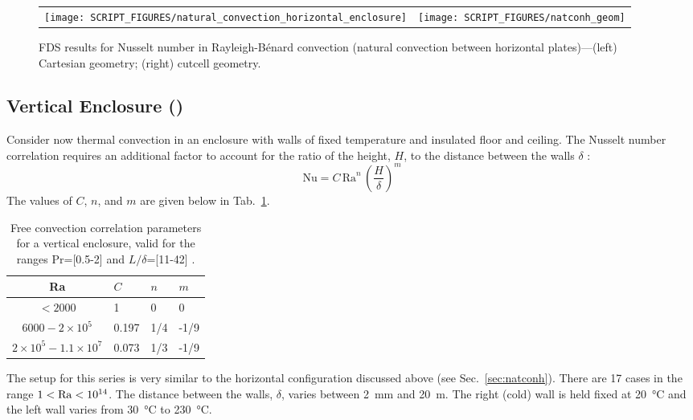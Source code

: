 \documentclass[11pt]{book}
\begin{document}
\begin{figure}[h]
   \centering
   \begin{tabular*}{\textwidth}{lr}
       \texttt{[image: SCRIPT\_FIGURES/natural\_convection\_horizontal\_enclosure]} &
       \texttt{[image: SCRIPT\_FIGURES/natconh\_geom]} \\
   \end{tabular*}
   \caption[Nusselt correlation Rayleigh-B\'{e}nard convection]{\label{fig_natconh} FDS results for Nusselt number in Rayleigh-B\'{e}nard convection (natural convection between horizontal plates)---(left) Cartesian geometry; (right) cutcell geometry.}
\end{figure}

\FloatBarrier


\subsection{Vertical Enclosure (\texorpdfstring{}{natconv})}
\label{sec:natconv}

Consider now thermal convection in an enclosure with walls of fixed temperature and insulated floor and ceiling.  The Nusselt number correlation requires an additional factor to account for the ratio of the height, $H$, to the distance between the walls $\delta$ \cite{Holman:1}:
\begin{equation}
\mathrm{Nu} = C \,\mathrm{Ra}^n \,\left(\frac{H}{\delta}\right)^m
\end{equation}
The values of $C$, $n$, and $m$ are given below in Tab.~\ref{tab:freeconv}.
\begin{table}[h]
\centering
\caption[Free convection correlation parameters for a vertical enclosure]{Free convection correlation parameters for a vertical enclosure, valid for the ranges Pr=[0.5-2] and $L/\delta$=[11-42] \cite{Holman:1}.}
\label{tab:freeconv}
\begin{tabular}{clll}
Ra                                   & $C$    & $n$ & $m$  \\
\hline
$<2000$                              & 1      & 0   & 0    \\
$6000 - 2 \times 10^5$               & 0.197  & 1/4 & -1/9 \\
$2 \times 10^5 - 1.1 \times 10^7$    & 0.073  & 1/3 & -1/9
\end{tabular}
\end{table}
The setup for this series is very similar to the horizontal configuration discussed above (see Sec.~\ref{sec:natconh}). There are 17 cases in the range $1 < {\rm Ra} < 10^{14}$.  The distance between the walls, $\delta$, varies between 2~mm  and 20~m. The right (cold) wall is held fixed at 20~\si{\degreeCelsius} and the left wall varies from 30~\si{\degreeCelsius} to 230~\si{\degreeCelsius}.
\end{document}
